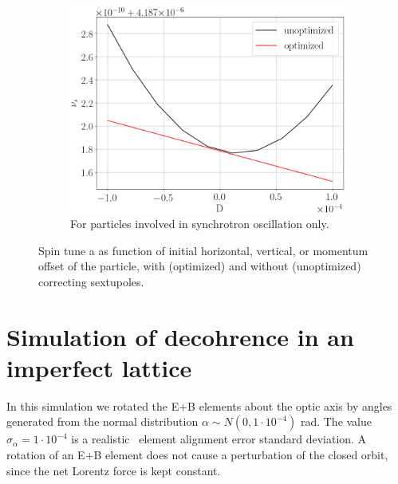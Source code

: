 \documentclass[a4paper]{jacow}
\newcommand{\subwidth}{.9\linewidth}
\begin{document}
\begin{figure}[ht]
\begin{subfigure}{\subwidth}
    \centering
    \includegraphics[width=\linewidth]{../img/IPAC19/spin_tune_decoh_d_offset}
    \caption{For particles involved in synchrotron oscillation only.\label{fig:st_decoh_synchrotron}}
  \end{subfigure}
  \caption{Spin tune a as function of initial horizontal, vertical, or momentum offset of the particle,
    with (optimized) and without (unoptimized) correcting sextupoles.\label{fig:decoherence_suppression_sim}}
\end{figure}

\section{Simulation of decohrence in an imperfect lattice}
In this simulation we rotated the E+B elements about the optic axis by angles generated from the
normal distribution $\alpha \sim N(0, 1\cdot 10^{-4})$ rad. The value $\sigma_\alpha = 1\cdot 10^{-4}$ is
a realistic~\cite{Senichev:2017amn} element alignment error standard deviation. A rotation of an E+B element
does not cause a perturbation of the closed orbit, since the net Lorentz force is kept constant.
\end{document}
